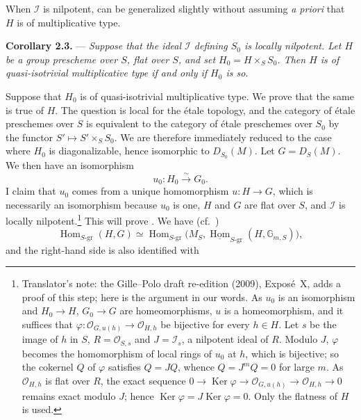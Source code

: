 When \(\mathscr I\) is nilpotent,  can be generalized slightly
without assuming \emph{a priori} that \(H\) is of multiplicative
type.

\medskip
\noindent{}%
\textbf{Corollary 2.3.} ---
\textit{Suppose that the ideal \(\mathscr I\) defining \(S_0\) is
locally nilpotent. Let \(H\) be a group prescheme over \(S\), flat
over \(S\), and set \(H_0=H\times_S S_0\). Then \(H\) is of
quasi-isotrivial multiplicative type if and only if \(H_0\) is so.}

Suppose that \(H_0\) is of quasi-isotrivial multiplicative type. We
prove that the same is true of \(H\). The question is local for the
étale topology, and the category of étale preschemes over \(S\)
is equivalent to the category of étale preschemes over \(S_0\) by the
functor \(S'\mapsto S'\times_S S_0\). We are therefore immediately
reduced to the case where \(H_0\) is diagonalizable, hence isomorphic
to \(D_{S_0}(M)\). Let \(G=D_S(M)\). We then have an isomorphism
\[
  u_0:H_0\xrightarrow{\sim}G_0.
\]
I claim that \(u_0\) comes from a unique homomorphism \(u:H\to G\),
which is necessarily an isomorphism because \(u_0\) is one, \(H\) and
\(G\) are flat over \(S\), and \(\mathscr I\) is locally
nilpotent.\footnote{Translator's note: the Gille--Polo draft re-edition
(2009), Expos\'e~X, adds a proof of this step; here is the argument in
our words. As \(u_0\) is an isomorphism and \(H_0\to H\), \(G_0\to G\)
are homeomorphisms, \(u\) is a homeomorphism, and it suffices that
\(\varphi:\mathscr O_{G,u(h)}\to\mathscr O_{H,h}\) be bijective for
every \(h\in H\). Let \(s\) be the image of \(h\) in \(S\),
\(R=\mathscr O_{S,s}\) and \(J=\mathscr I_s\), a nilpotent ideal of
\(R\). Modulo \(J\), \(\varphi\) becomes the homomorphism of local rings
of \(u_0\) at \(h\), which is bijective; so the cokernel \(Q\) of
\(\varphi\) satisfies \(Q=JQ\), whence \(Q=J^mQ=0\) for large \(m\). As
\(\mathscr O_{H,h}\) is flat over \(R\), the exact sequence
\(0\to\operatorname{Ker}\varphi\to\mathscr O_{G,u(h)}\to
\mathscr O_{H,h}\to0\) remains exact modulo \(J\); hence
\(\operatorname{Ker}\varphi=J\operatorname{Ker}\varphi=0\). Only the
flatness of \(H\) is used.}
This will prove . We have (cf.\ )
\[
  \operatorname{Hom}_{S\text{-}\mathrm{gr}}(H,G)
  \simeq
  \operatorname{Hom}_{S\text{-}\mathrm{gr}}
  \bigl(M_S,
    \underline{\operatorname{Hom}}_{S\text{-}\mathrm{gr}}
      (H,\mathbb G_{m,S})\bigr),
\]
and the right-hand side is also identified with
